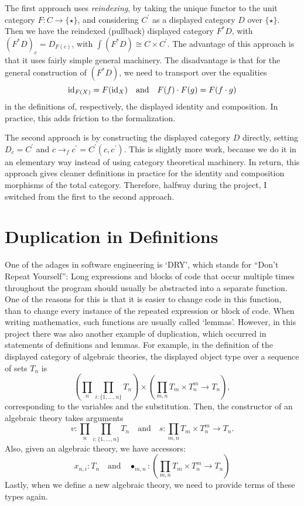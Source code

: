 The first approach uses \textit{reindexing}, by taking the unique functor to the unit category $ F : C \to \{ \star \} $, and considering $ C^\prime $ as a displayed category $ D $ over $ \{ \star \} $. Then we have the reindexed (pullback) displayed category $ F^* D $, with $ (F^* D)_c = D_{F(c)} $, with $ \int (F^* D) \cong C \times C^\prime $. The advantage of this approach is that it uses fairly simple general machinery. The disadvantage is that for the general construction of $ (F^* D) $, we need to transport over the equalities
\[ \text{id}_{F(X)} = F(\text{id}_{X}) \quad \text{and} \quad F(f) \cdot F(g) = F(f \cdot g) \]
in the definitions of, respectively, the displayed identity and composition. In practice, this adds friction to the formalization.

The second approach is by constructing the displayed category $ D $ directly, setting $ D_c = C^\prime $ and $ c \to_f c^\prime = C^\prime(c, c^\prime) $. This is slightly more work, because we do it in an elementary way instead of using category theoretical machinery. In return, this approach gives cleaner definitions in practice for the identity and composition morphisms of the total category. Therefore, halfway during the project, I switched from the first to the second approach.

\section{Duplication in Definitions}
One of the adages in software engineering is `DRY', which stands for ``Don't Repeat Yourself'': Long expressions and blocks of code that occur multiple times throughout the program should usually be abstracted into a separate function. One of the reasons for this is that it is easier to change code in this function, than to change every instance of the repeated expression or block of code. When writing mathematics, such functions are usually called `lemmas'. However, in this project there was also another example of duplication, which occurred in statements of definitions and lemmas. For example, in the definition of the displayed category of algebraic theories, the displayed object type over a sequence of sets $ T_n $ is
\[ \left(\prod_n \prod_{i : \{ 1, \dots, n \}} T_n \right) \times \left( \prod_{m, n} T_m \times T_n^m \to T_n \right), \]
corresponding to the variables and the substitution. Then, the constructor of an algebraic theory takes arguments
\[ v : \prod_n \prod_{i : \{ 1, \dots, n \}} T_n \quad \text{and} \quad s : \prod_{m, n} T_m \times T_n^m \to T_n. \]
Also, given an algebraic theory, we have accessors:
\[ x_{n, i} : T_n \quad \text{and} \quad \bullet_{m, n} : (\prod_{m, n} T_m \times T_n^m \to T_n) \]
Lastly, when we define a new algebraic theory, we need to provide terms of these types again.

